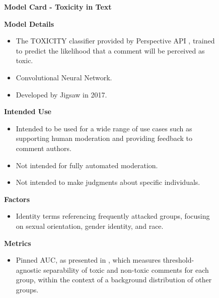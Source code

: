 \begin{figure}
\raggedright
\begin{framed}
\begin{center}{\LARGE {\bf Model Card - Toxicity in Text}}\end{center} 
    \begin{minipage}{.45\textwidth}


{\bf Model Details} 
\begin{itemize}[leftmargin=*]
\item The TOXICITY classifier provided by Perspective API \cite{perspective_api}, trained to predict the likelihood that a comment will be perceived as toxic. 
\item Convolutional Neural Network.
\item Developed by Jigsaw in 2017.
\end{itemize}

{\bf Intended Use}
\begin{itemize}[leftmargin=*]
\item Intended to be used for a wide range of use cases such as supporting human moderation and providing feedback to comment authors.
\item Not intended for fully automated moderation.
\item Not intended to make judgments about specific individuals.
\end{itemize}

{\bf Factors}
\begin{itemize}[leftmargin=*]
\item Identity terms referencing frequently attacked groups, focusing on sexual orientation, gender identity, and race.
\end{itemize}

{\bf Metrics}
\begin{itemize}[leftmargin=*]
\item Pinned AUC, as presented in \cite{DixonEtAl2018}, which measures threshold-agnostic separability of toxic and non-toxic comments for each group, within the context of a background distribution of other groups.
\end{itemize}


\end{minipage}
\end{framed}
\end{figure}
